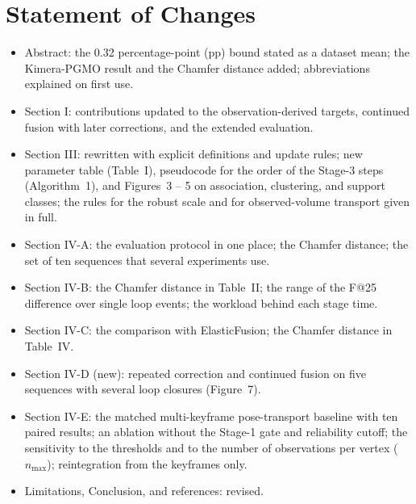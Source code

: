 \documentclass[11pt,a4paper]{article}
\begin{document}
\section*{Statement of Changes}
\begin{itemize}[nosep,leftmargin=*]
\item Abstract: the 0.32 percentage-point (pp) bound stated as a dataset mean; the Kimera-PGMO result and the Chamfer distance added; abbreviations explained on first use.
\item Section I: contributions updated to the observation-derived targets, continued fusion with later corrections, and the extended evaluation.
\item Section III: rewritten with explicit definitions and update rules; new parameter table (Table~I), pseudocode for the order of the Stage-3 steps (Algorithm~1), and Figures~3 -- 5 on association, clustering, and support classes; the rules for the robust scale and for observed-volume transport given in full.
\item Section IV-A: the evaluation protocol in one place; the Chamfer distance; the set of ten sequences that several experiments use.
\item Section IV-B: the Chamfer distance in Table~II; the range of the F@25 difference over single loop events; the workload behind each stage time.
\item Section IV-C: the comparison with ElasticFusion; the Chamfer distance in Table~IV.
\item Section IV-D (new): repeated correction and continued fusion on five sequences with several loop closures (Figure~7).
\item Section IV-E: the matched multi-keyframe pose-transport baseline with ten paired results; an ablation without the Stage-1 gate and reliability cutoff; the sensitivity to the thresholds and to the number of observations per vertex ($n_{\max}$); reintegration from the keyframes only.
\item Limitations, Conclusion, and references: revised.
\end{itemize}
\end{document}
